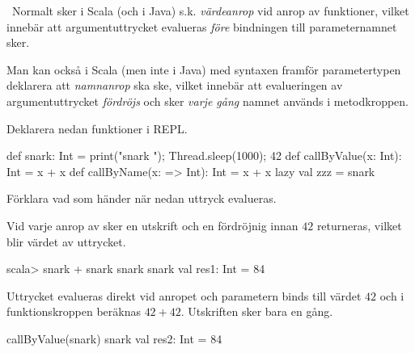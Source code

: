 \QUESTEND





\AdvancedTasks %








\QUESTBEGIN

\Task  \what~Normalt sker i Scala (och i Java) s.k. \emph{värdeanrop} vid anrop av funktioner, vilket innebär att argumentuttrycket evalueras \emph{före} bindningen till parameternamnet sker.

Man kan också i Scala (men inte i Java) med syntaxen \code{=>} framför parametertypen deklarera att \emph{namnanrop} ska ske, vilket innebär att evalueringen av argumentuttrycket \emph{fördröjs} och sker \emph{varje gång} namnet används i metodkroppen.

Deklarera nedan funktioner i REPL.

\begin{Code}
def snark: Int = { print("snark "); Thread.sleep(1000); 42 }
def callByValue(x: Int):   Int = x + x
def callByName(x: => Int): Int = x + x
lazy val zzz = snark
\end{Code}

\noindent Förklara vad som händer när nedan uttryck evalueras.

\Subtask {}

\Subtask {}

\Subtask {}

\Subtask {}

\SOLUTION

\TaskSolved \what

\SubtaskSolved Vid varje anrop av  sker en utskrift och en fördröjnig innan $42$ returneras,  vilket blir värdet av uttrycket.
\begin{REPL}
scala> snark + snark
snark snark val res1: Int = 84
\end{REPL}

\SubtaskSolved Uttrycket  evalueras direkt vid anropet och parametern  binds till värdet $42$ och i funktionskroppen beräknas $42+42$. Utskriften sker bara en gång.
\begin{REPL}
callByValue(snark)
snark val res2: Int = 84
\end{REPL}

